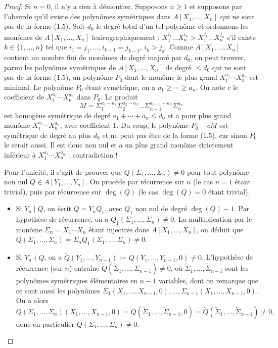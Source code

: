 \documentclass[]{report}
\begin{document}
\begin{proof}
    Si $n = 0$, il n'y a rien à démontrer. Supposons $n \ge 1$ et supposons par l'absurde qu'il existe des polynômes symétriques dans $A[X_1, \ldots, X_n]$ qui ne sont pas de la forme (1.5). Soit $d_0$ le degré total d'un tel polynôme et ordonnons les monômes de $A[X_1, \ldots, X_n]$ lexicographiquement : $X_1^{i_1} \ldots X_n^{i_n} > X_1^{j_1} \ldots X_n^{j_n}$ s'il existe $k \in \{1, \ldots, n\}$ tel que $i_1 = j_1, \ldots, i_{k-1} = j_{k-1}$, $i_k > j_k$. Comme $A[X_1, \ldots, X_n]$ contient un nombre fini de monômes de degré majoré par $d_0$, on peut trouver, parmi les polynômes symétriques de $A[X_1, \ldots, X_n]$ de degré $\le d_0$ qui ne sont pas de la forme (1.5), un polynôme $P_0$ dont le monôme le plus grand $X_1^{a_1} \cdots X_n^{a_n}$ est minimal. Le polynôme $P_0$ étant symétrique, on a $a_1 \ge \cdots \ge a_n$. On note $c$ le coefficient de $X_1^{a_1} \cdots X_n^{a_n}$ dans $P_0$. Le produit
    \[M = \Sigma_1^{a_1 - a_2} \Sigma_2^{a_2 - a_3} \dots \Sigma_{n-1}^{a_{n-1} - a_n} \Sigma_n^{a_n}\]
    est homogène symétrique de degré $a_1 + \cdots + a_n \le d_0$ et a pour plus grand monôme $X_1^{a_1} \cdots X_n^{a_n}$, avec coefficient 1. Du coup, le polynôme $P_0 - cM$ est symétrique de degré au plus $d_0$ et ne peut pas être de la forme (1.5), car sinon $P_0$ le serait aussi. Il est donc non nul et a un plus grand monôme strictement inférieur à $X_1^{a_1} \cdots X_n^{a_n}$ : contradiction !

    Pour l'unicité, il s'agit de prouver que $Q(\Sigma_1, \ldots, \Sigma_n) \neq 0$ pour tout polynôme non nul $Q \in A[Y_1, \ldots, Y_n]$. On procède par récurrence sur $n$ (le cas $n = 1$ étant trivial), puis par récurrence sur $\deg(Q)$ (le cas $\deg(Q) = 0$ étant trivial).
    \begin{itemize}
        \item Si $Y_n \mid Q$, on écrit $Q = Y_n Q_1$, avec $Q_1$ non nul de degré $\deg(Q) - 1$. Par hypothèse de récurrence, on a $Q_1(\Sigma_1, \ldots, \Sigma_n) \neq 0$. La multiplication par le monôme $\Sigma_n = X_1 \cdots X_n$ étant injective dans $A[X_1, \ldots, X_n]$, on déduit que $Q(\Sigma_1, \ldots, \Sigma_n) = \Sigma_n Q_1(\Sigma_1, \ldots, \Sigma_n) \neq 0$.
        \item Si $Y_n \nmid Q$, on a $\tilde{Q}(Y_1, \ldots, Y_{n-1}) := Q(Y_1, \ldots, Y_{n-1}, 0) \neq 0$. L'hypothèse de récurrence (sur $n$) entraîne $\tilde{Q}(\tilde{\Sigma}_1, \ldots, \tilde{\Sigma}_{n-1}) \neq 0$, où $\tilde{\Sigma}_1, \ldots, \tilde{\Sigma}_{n-1}$ sont les polynômes symétriques élémentaires en $n-1$ variables, dont on remarque que ce sont aussi les polynômes $\Sigma_1(X_1, \ldots, X_{n-1}, 0), \ldots, \Sigma_{n-1}(X_1, \ldots, X_{n-1}, 0)$. On a alors
        \[Q(\Sigma_1, \ldots, \Sigma_n)(X_1, \ldots, X_{n-1}, 0) = Q(\tilde{\Sigma}_1, \ldots, \tilde{\Sigma}_{n-1}, 0) = \tilde{Q}(\tilde{\Sigma}_1, \ldots, \tilde{\Sigma}_{n-1}) \neq 0,\]
        donc en particulier $Q(\Sigma_1, \ldots, \Sigma_n) \neq 0$.
    \end{itemize}
\end{proof}
\end{document}
